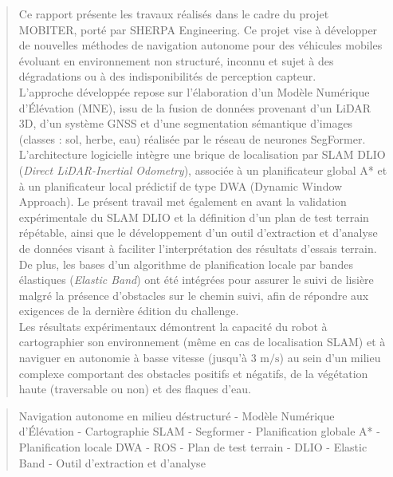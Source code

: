 \documentclass{CoursENSAM}
\begin{document}
\rfoot{} %
\renewcommand{\abstractname}{Résumé}
\begin{abstract}
Ce rapport présente les travaux réalisés dans le cadre du projet MOBITER, porté par SHERPA Engineering. Ce projet vise à développer de nouvelles méthodes de navigation autonome pour des véhicules mobiles évoluant en environnement non structuré, inconnu et sujet à des dégradations ou à des indisponibilités de perception capteur.\\
\indent L'approche développée repose sur l'élaboration d'un Modèle Numérique d'Élévation (MNE), issu de la fusion de données provenant d'un LiDAR 3D, d'un système GNSS et d'une segmentation sémantique d'images (classes : sol, herbe, eau) réalisée par le réseau de neurones SegFormer. L'architecture logicielle intègre une brique de localisation par SLAM DLIO (\textit{Direct LiDAR-Inertial Odometry}), associée à un planificateur global A* et à un planificateur local prédictif de type DWA (Dynamic Window Approach). Le présent travail met également en avant la validation expérimentale du SLAM DLIO et la définition d'un plan de test terrain répétable, ainsi que le développement d'un outil d'extraction et d'analyse de données visant à faciliter l'interprétation des résultats d'essais terrain. De plus, les bases d'un algorithme de planification locale par bandes élastiques (\textit{Elastic Band}) ont été intégrées pour assurer le suivi de lisière malgré la présence d'obstacles sur le chemin suivi, afin de répondre aux exigences de la dernière édition du challenge.\\
\indent Les résultats expérimentaux démontrent la capacité du robot à cartographier son environnement (même en cas de localisation SLAM) et à naviguer en autonomie à basse vitesse (jusqu'à $3\text{ m/s}$) au sein d'un milieu complexe comportant des obstacles positifs et négatifs, de la végétation haute (traversable ou non) et des flaques d'eau.
\end{abstract}

\renewcommand{\abstractname}{Mots-clés}
\begin{abstract}
\begin{center}
    Navigation autonome en milieu déstructuré - Modèle Numérique d'Élévation - Cartographie SLAM - Segformer - Planification globale A* - Planification locale DWA - ROS - Plan de test terrain - DLIO - Elastic Band - Outil d'extraction et d'analyse
\end{center}
\end{abstract}
\vspace{0.5cm}
\end{document}
